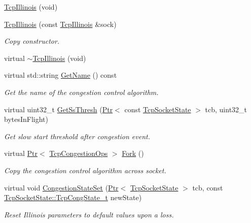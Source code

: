 \begin{DoxyCompactItemize}
\item 
\hyperlink{classns3_1_1TcpIllinois_a25b0b11f6aa911cc5d2fc875ae188804}{Tcp\+Illinois} (void)
\item 
\hyperlink{classns3_1_1TcpIllinois_a731073a48ecc5a678f6e9f2d12ba2fd0}{Tcp\+Illinois} (const \hyperlink{classns3_1_1TcpIllinois}{Tcp\+Illinois} \&sock)
\begin{DoxyCompactList}\small\item\em Copy constructor. \end{DoxyCompactList}\item 
virtual \hyperlink{classns3_1_1TcpIllinois_a67c1cd2eacbb508e574e58c3f5249a29}{$\sim$\+Tcp\+Illinois} (void)
\item 
virtual std\+::string \hyperlink{classns3_1_1TcpIllinois_a4515a565bdc968d90a4f7dc160dbd3ff}{Get\+Name} () const 
\begin{DoxyCompactList}\small\item\em Get the name of the congestion control algorithm. \end{DoxyCompactList}\item 
virtual uint32\+\_\+t \hyperlink{classns3_1_1TcpIllinois_a5c041aa5385217f81f97d1b730c90ca6}{Get\+Ss\+Thresh} (\hyperlink{classns3_1_1Ptr}{Ptr}$<$ const \hyperlink{classns3_1_1TcpSocketState}{Tcp\+Socket\+State} $>$ tcb, uint32\+\_\+t bytes\+In\+Flight)
\begin{DoxyCompactList}\small\item\em Get slow start threshold after congestion event. \end{DoxyCompactList}\item 
virtual \hyperlink{classns3_1_1Ptr}{Ptr}$<$ \hyperlink{classns3_1_1TcpCongestionOps}{Tcp\+Congestion\+Ops} $>$ \hyperlink{classns3_1_1TcpIllinois_a42f28764801115e88e38bff513d4b893}{Fork} ()
\begin{DoxyCompactList}\small\item\em Copy the congestion control algorithm across socket. \end{DoxyCompactList}\item 
virtual void \hyperlink{classns3_1_1TcpIllinois_a5740754bb7f9db5557a5ae5e33ba7ffb}{Congestion\+State\+Set} (\hyperlink{classns3_1_1Ptr}{Ptr}$<$ \hyperlink{classns3_1_1TcpSocketState}{Tcp\+Socket\+State} $>$ tcb, const \hyperlink{classns3_1_1TcpSocketState_a6fc313945a33d48fd60cbffe0c787b19}{Tcp\+Socket\+State\+::\+Tcp\+Cong\+State\+\_\+t} new\+State)
\begin{DoxyCompactList}\small\item\em Reset Illinois parameters to default values upon a loss. \end{DoxyCompactList}\item 

\end{DoxyCompactItemize}
